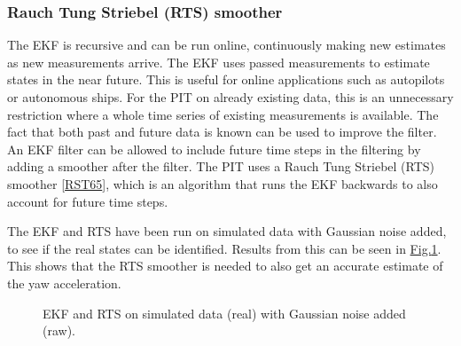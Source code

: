 \documentclass[review]{elsarticle}
\begin{document}
\subsubsection{Rauch Tung Striebel (RTS) smoother}
\label{\detokenize{04.01_EK:rauch-tung-striebel-rts-smoother}}\label{\detokenize{04.01_EK:rts}}
\sphinxAtStartPar
The EKF is recursive and can be run online, continuously making new estimates as new measurements arrive. The EKF uses passed measurements to estimate states in the near future. This is useful for online applications such as  autopilots or autonomous ships. For the PIT on already existing data, this is an unnecessary restriction where a whole time series of existing measurements is available. The fact that both past and future data is known can be used to improve the filter. An EKF filter can be allowed to include future time steps in the filtering by adding a smoother after the filter. The PIT uses a Rauch Tung Striebel (RTS) smoother {[}\hyperlink{cite.bibligraphy:id67}{RST65}{]}, which is an algorithm that runs the EKF backwards to also account for future time steps.

\sphinxAtStartPar
The EKF and RTS have been run on simulated data with Gaussian noise added, to see if the real states can be identified. Results from this can be seen in  \hyperref[\detokenize{04.01_EK:fig-ekf}]{Fig.\@ \ref{\detokenize{04.01_EK:fig-ekf}}}. This shows that the RTS smoother is needed to also get an accurate estimate of the yaw acceleration.

\begin{figure}[H]
\centering
\capstart

\noindent{}
\caption{EKF and RTS on simulated data (real) with Gaussian noise added (raw).}\label{\detokenize{04.01_EK:fig-ekf}}\end{figure}
\end{document}
